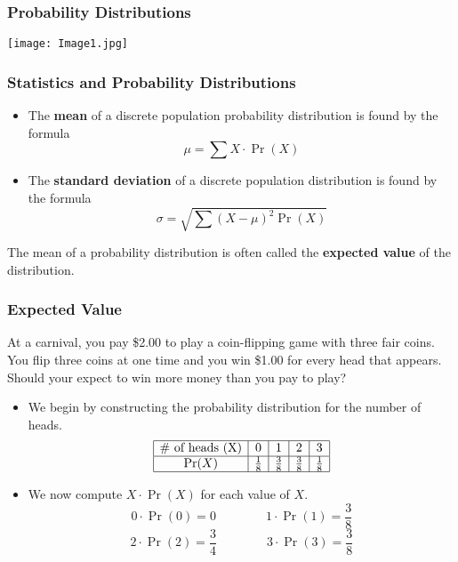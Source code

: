 \documentclass[Lecture.tex]{subfiles}
\begin{document}
\begin{frame}
\frametitle{Probability Distributions}\pause
\centerline{\texttt{[image: Image1.jpg]}}
\end{frame}

\begin{frame}
\frametitle{Statistics and Probability Distributions}\pause
\begin{itemize}
\item The \textbf{mean} of a discrete population probability distribution is found by the formula
$$\mu=\sum X\cdot\Pr(X)$$\pause
\item The \textbf{standard deviation} of a discrete population distribution is found by the formula
$$\sigma=\sqrt{\sum(X-\mu)^2\Pr(X)}$$
\end{itemize}
\begin{definition}
The mean of a probability distribution is often called the \textbf{expected value} of the distribution.
\end{definition}
\end{frame}

\begin{frame}
\frametitle{Expected Value}\pause
\vspace*{-.15in}
\begin{example}
At a carnival, you pay \$2.00 to play a coin-flipping game with three fair coins.  You flip three coins at one time and you win \$1.00 for every head that appears.  Should your expect to win more money than you pay to play?
\end{example}\pause
\begin{itemize}
\item We begin by constructing the probability distribution for the number of heads.\pause
$$\begin{array}{|c|c|c|c|c|}
\hline
\text{\# of heads (X)}&0&1&2&3\\
\hline
\Pr(X)&\frac{1}{8}&\frac{3}{8}&\frac{3}{8}&\frac{1}{8}\\
\hline
\end{array}$$\pause
\item We now compute $X\cdot\Pr(X)$ for each value of $X$.\pause
$$0\cdot\Pr(0)=0\qquad\qquad 1\cdot\Pr(1)=\frac{3}{8}$$
$$2\cdot\Pr(2)=\frac{3}{4}\qquad\qquad 3\cdot\Pr(3)=\frac{3}{8}$$
\end{itemize}
\end{frame}
\end{document}
